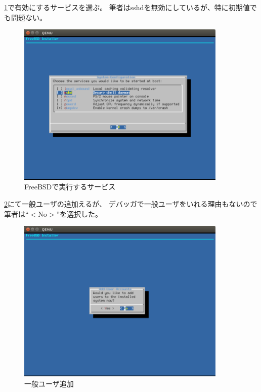 \documentclass[a4j]{jarticle}
\begin{document}
\ref{fig:FreeBSD_Service}で有効にするサービスを選ぶ。
筆者はsshdを無効にしているが、特に初期値でも問題ない。
\begin{figure}[htbp]
	\centering
	\includegraphics[width=10cm]{./IMG/FreeBSD_SYS.png}
    \caption{FreeBSDで実行するサービス}
    \label{fig:FreeBSD_Service}
\end{figure}

\ref{fig:FreeBSD_ADD_U}にて一般ユーザの追加えるが、
デバッガで一般ユーザをいれる理由もないので筆者は``$<$No$>$''を選択した。
\begin{figure}[htbp]
	\centering
	\includegraphics[width=10cm]{./IMG/FreeBSD_ADD_USER.png}
    \caption{一般ユーザ追加}
    \label{fig:FreeBSD_ADD_U}
\end{figure}
\clearpage
\end{document}
